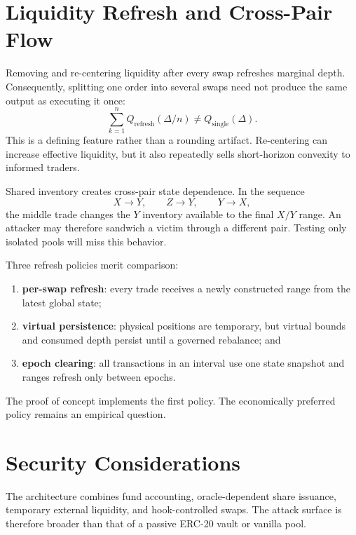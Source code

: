\documentclass[11pt]{article}
\begin{document}
\section{Liquidity Refresh and Cross-Pair Flow}

Removing and re-centering liquidity after every swap refreshes marginal depth.
Consequently, splitting one order into several swaps need not produce the same
output as executing it once:
\begin{equation}
  \sum_{k=1}^{n}Q_{\mathrm{refresh}}(\Delta/n)
  \ne Q_{\mathrm{single}}(\Delta).
  \label{eq:split}
\end{equation}
This is a defining feature rather than a rounding artifact. Re-centering can
increase effective liquidity, but it also repeatedly sells short-horizon
convexity to informed traders.

Shared inventory creates cross-pair state dependence. In the sequence
\begin{equation*}
  X\rightarrow Y,\qquad Z\rightarrow Y,\qquad Y\rightarrow X,
\end{equation*}
the middle trade changes the $Y$ inventory available to the final $X/Y$ range.
An attacker may therefore sandwich a victim through a different pair. Testing
only isolated pools will miss this behavior.

Three refresh policies merit comparison:

\begin{enumerate}
  \item \textbf{per-swap refresh}: every trade receives a newly constructed
        range from the latest global state;
  \item \textbf{virtual persistence}: physical positions are temporary, but
        virtual bounds and consumed depth persist until a governed rebalance;
        and
  \item \textbf{epoch clearing}: all transactions in an interval use one state
        snapshot and ranges refresh only between epochs.
\end{enumerate}

The proof of concept implements the first policy. The economically preferred
policy remains an empirical question.

\section{Security Considerations}

The architecture combines fund accounting, oracle-dependent share issuance,
temporary external liquidity, and hook-controlled swaps. The attack surface is
therefore broader than that of a passive ERC-20 vault or vanilla pool.
\end{document}
